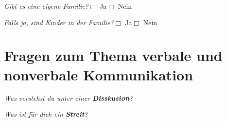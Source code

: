 \documentclass[a4paper,12pt]{scrartcl}
\newcommand{\checkbox}{\(\Box\)}
\newcommand{\hfilloutline}[1]{\rule{#1}{0.5pt}}
\newcommand{\frage}[1]{\textit{#1}}
\renewcommand{\emph}[1]{\textbf{#1}}
\begin{document}
\frage{Gibt es eine eigene Familie?}\hfill \checkbox{} Ja\hspace{0.8cm}\checkbox{} Nein\par
\frage{Falls ja, sind Kinder in der Familie?}\hfill \checkbox{} Ja\hspace{0.8cm}\checkbox{} Nein
\TextField[multiline, name=Notizen,width=0.9\textwidth,  height=3.25cm, value={}, backgroundcolor={0.95 0.95 0.95}]{}
\newpage







\section*{Fragen zum Thema verbale und nonverbale Kommunikation}

\frage{Was verstehst du unter einer \emph{Disskusion}?}
\vspace{3cm}

\frage{Was ist für dich ein \emph{Streit}?}
\vspace{3cm}
\end{document}
